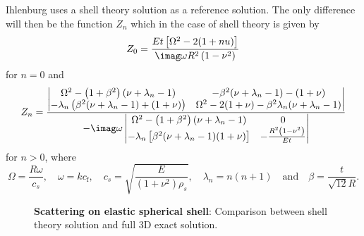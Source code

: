 Ihlenburg uses a shell theory solution as a reference solution. The only difference will then be the function $Z_n$ which in the case of shell theory is given by
\begin{equation*}
	Z_0 = \frac{E t\left[\Omega^2 - 2(1+nu)\right]}{\imag\omega R^2\left(1-\nu^2\right)}
\end{equation*}
for $n=0$ and
\begin{equation*}
	Z_n = \frac{\begin{vmatrix}
	\Omega^2-\left(1+\beta^2\right)(\nu+\lambda_n-1) & -\beta^2(\nu+\lambda_n - 1)-(1+\nu)\\
	-\lambda_n \left(\beta^2(\nu+\lambda_n-1)+(1+\nu)\right) & \Omega^2-2(1+\nu)-\beta^2\lambda_n (\nu+\lambda_n-1)
	\end{vmatrix}}{-\imag\omega\begin{vmatrix}
		\Omega^2-\left(1+\beta^2\right)(\nu+\lambda_n-1) & 0\\
		-\lambda_n\left[\beta^2(\nu+\lambda_n-1)(1+\nu)\right] & -\frac{R^2\left(1-\nu^2\right)}{Et}
	\end{vmatrix}}
\end{equation*}
for $n>0$, where
\begin{equation*}
	\Omega = \frac{R\omega}{c_s},\quad\omega = kc_{\mathrm{f}},\quad c_s = \sqrt{\frac{E}{(1+\nu^2)\rho_s}},\quad \lambda_n = n(n+1)\quad\text{and}\quad \beta = \frac{t}{\sqrt{12}R}.
\end{equation*}
\begin{figure}
	\centering
	\caption[Comparison between shell theory solution and full 3D exact solution]{\textbf{Scattering on elastic spherical shell}: Comparison between shell theory solution and full 3D exact solution.}
\label{Fig2:shellTheory3Dcomparison}
\end{figure}


